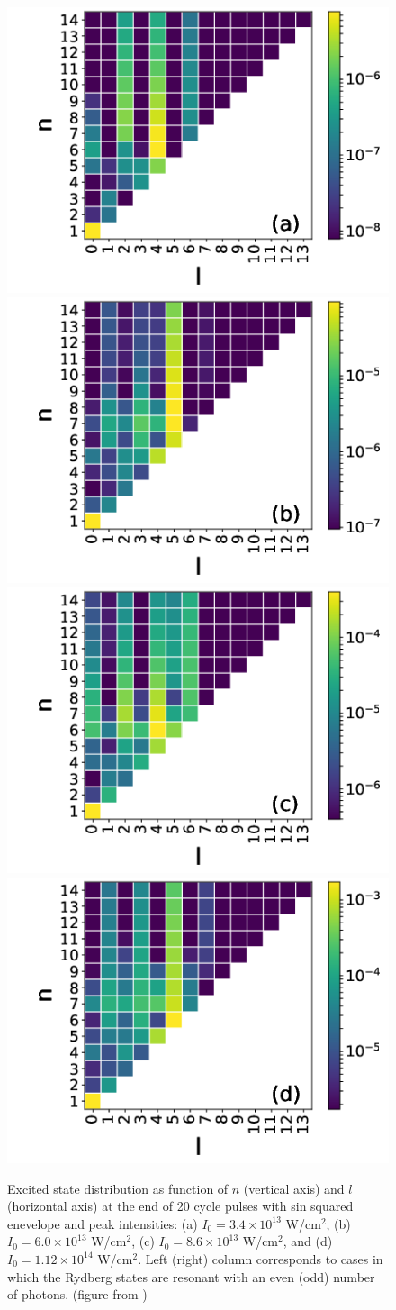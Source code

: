 \begin{figure}[!ht]
\centering
\includegraphics[width=0.32\columnwidth]{figs/Rydberg/heat_20_cyc_3p4e13_rev.png}
\includegraphics[width=0.32\columnwidth]{figs/Rydberg/heat_20_cyc_6p0e13_rev.png}\\
\includegraphics[width=0.32\columnwidth]{figs/Rydberg/heat_20_cyc_8p6e13_rev.png}
\includegraphics[width=0.32\columnwidth]{figs/Rydberg/heat_20_cyc_11p2e13_rev.png}
\caption{\label{fig:parity}
Excited state distribution as function of $n$ (vertical axis) and $l$ (horizontal axis) at the end of 20 cycle pulses with sin squared enevelope and peak intensities: 
(a) $I_0 = 3.4\times10^{13}$ W/cm$^2$, 
(b) $I_0 = 6.0\times10^{13}$ W/cm$^2$, 
(c) $I_0 = 8.6\times10^{13}$ W/cm$^2$, and 
(d) $I_0 = 1.12\times10^{14}$ W/cm$^2$. 
Left (right) column corresponds to cases in which the Rydberg states are resonant with an even (odd) number of photons. (figure from \cite{venzke2018_ryd})
}
\end{figure}

